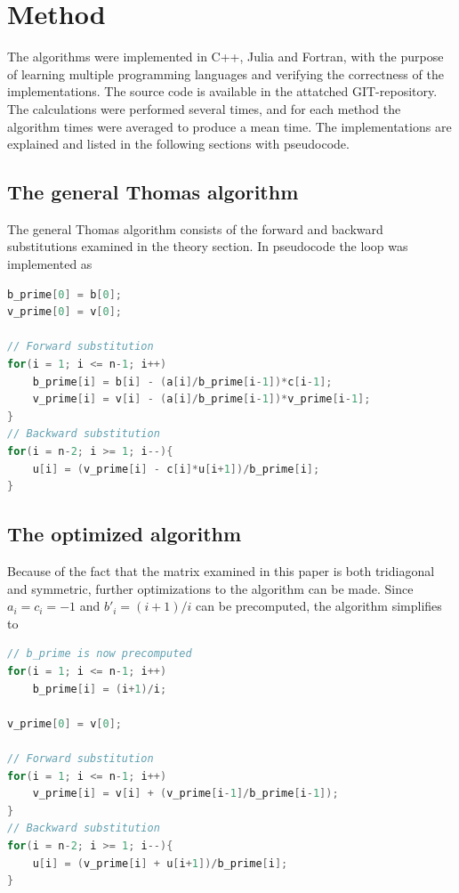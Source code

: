 \documentclass[a4paper,11pt, english, twoside]{article}
\begin{document}
\section{Method}
The algorithms were implemented in C++, Julia and Fortran, with the purpose of
learning multiple programming languages and verifying the correctness of the implementations.
The source code is available in the attatched GIT-repository. The calculations
were performed several times, and for each method the algorithm times were averaged to produce a
mean time. The implementations are explained and listed in the following sections with pseudocode.

\subsection{The general Thomas algorithm}
The general Thomas algorithm consists of the forward and backward substitutions
examined in the theory section. In pseudocode the loop was implemented as
\begin{lstlisting}[language=cpp, caption={Thomas algorithm implementation for a general tridiagonal matrix}]
b_prime[0] = b[0];
v_prime[0] = v[0];

// Forward substitution
for(i = 1; i <= n-1; i++)
    b_prime[i] = b[i] - (a[i]/b_prime[i-1])*c[i-1];
    v_prime[i] = v[i] - (a[i]/b_prime[i-1])*v_prime[i-1];
}
// Backward substitution
for(i = n-2; i >= 1; i--){
    u[i] = (v_prime[i] - c[i]*u[i+1])/b_prime[i];
}
\end{lstlisting}
\subsection{The optimized algorithm}
Because of the fact that the matrix examined in this paper is both tridiagonal and
symmetric, further optimizations to the algorithm can be made. Since $a_i = c_i = -1$
and $b'_i = (i+1)/i$ can be precomputed, the algorithm simplifies to
\begin{lstlisting}[language=cpp, caption={Optimized version of Thomas algorithm for a symmetrix tridiagonal matrix}]
// b_prime is now precomputed
for(i = 1; i <= n-1; i++)
    b_prime[i] = (i+1)/i;

v_prime[0] = v[0];

// Forward substitution
for(i = 1; i <= n-1; i++)
    v_prime[i] = v[i] + (v_prime[i-1]/b_prime[i-1]);
}
// Backward substitution
for(i = n-2; i >= 1; i--){
    u[i] = (v_prime[i] + u[i+1])/b_prime[i];
}
\end{lstlisting}
\end{document}
